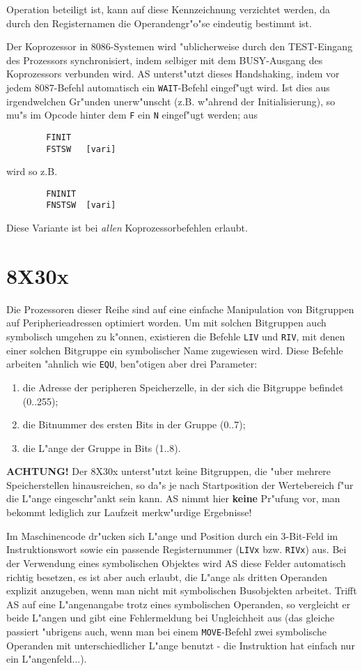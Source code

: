 \documentclass[12pt,a4paper,twoside]{report}
\newcommand{\ii}[1]{{\it #1}}
\newcommand{\bb}[1]{{\bf #1}}
\newcommand{\tty}[1]{{\tt #1}}
\begin{document}
Operation beteiligt ist, kann auf diese Kennzeichnung verzichtet werden, da
durch den Registernamen die Operandengr"o"se eindeutig bestimmt ist.
\par
Der Koprozessor in 8086-Systemen wird "ublicherweise durch den TEST-Eingang
des Prozessors synchronisiert, indem selbiger mit dem BUSY-Ausgang des
Koprozessors verbunden wird.  AS unterst"utzt dieses Handshaking, indem
vor jedem 8087-Befehl automatisch ein \tty{WAIT}-Befehl eingef"ugt wird.  Ist
dies aus irgendwelchen Gr"unden unerw"unscht (z.B. w"ahrend der
Initialisierung), so mu"s im Opcode hinter dem \tty{F} ein \tty{N} eingef"ugt
werden; aus
\begin{verbatim}
        FINIT
        FSTSW   [vari]
\end{verbatim}
wird so z.B.
\begin{verbatim}
        FNINIT
        FNSTSW  [vari]
\end{verbatim}
Diese Variante ist bei \ii{allen} Koprozessorbefehlen erlaubt.


\section{8X30x}
\label{8X30xSpec}

Die Prozessoren dieser Reihe sind auf eine einfache Manipulation von
Bitgruppen auf Peripherieadressen optimiert worden.  Um mit solchen
Bitgruppen auch symbolisch umgehen zu k"onnen, existieren die Befehle
\tty{LIV} und \tty{RIV}, mit denen einer solchen Bitgruppe ein
symbolischer Name zugewiesen wird.  Diese Befehle arbeiten "ahnlich
wie \tty{EQU}, ben"otigen aber drei Parameter:
\begin{enumerate}
\item{die Adresse der peripheren Speicherzelle, in der sich die
      Bitgruppe befindet (0..255);}
\item{die Bitnummer des ersten Bits in der Gruppe (0..7);}
\item{die L"ange der Gruppe in Bits (1..8).}
\end{enumerate}
\bb{ACHTUNG!}  Der 8X30x unterst"utzt keine Bitgruppen, die "uber mehrere
Speicherstellen hinausreichen, so da"s je nach Startposition der
Wertebereich f"ur die L"ange eingeschr"ankt sein kann.  AS nimmt hier
\bb{keine} Pr"ufung vor, man bekommt lediglich zur Laufzeit merkw"urdige
Ergebnisse!

Im Maschinencode dr"ucken sich L"ange und Position durch ein 3-Bit-Feld
im Instruktionswort sowie ein passende Registernummer (\tty{LIVx} bzw.
\tty{RIVx}) aus.  Bei der Verwendung eines symbolischen Objektes wird AS
diese Felder automatisch richtig besetzen, es ist aber auch erlaubt,
die L"ange als dritten Operanden explizit anzugeben, wenn man nicht
mit symbolischen Busobjekten arbeitet.  Trifft AS auf eine L"angenangabe
trotz eines symbolischen Operanden, so vergleicht er beide L"angen
und gibt eine Fehlermeldung bei Ungleichheit aus (das gleiche passiert
"ubrigens auch, wenn man bei einem \tty{MOVE}-Befehl zwei symbolische
Operanden mit unterschiedlicher L"ange benutzt - die Instruktion hat
einfach nur ein L"angenfeld...).
\end{document}
